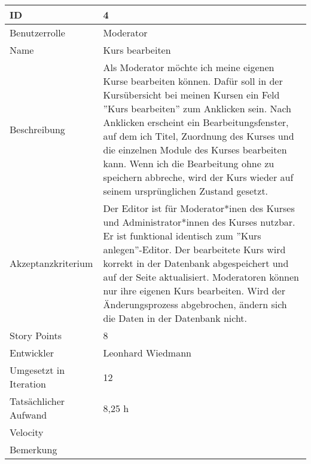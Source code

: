 \begin{tabularx}{\textwidth}{|p{}|X|}
	\hline
	ID & 4\\
	\hline
	Benutzerrolle & Moderator\\
	\hline
	Name & Kurs bearbeiten\\
	\hline
	Beschreibung & Als Moderator möchte ich meine eigenen Kurse bearbeiten können. Dafür soll in der Kursübersicht bei meinen Kursen ein Feld ''Kurs bearbeiten'' zum Anklicken sein. Nach Anklicken erscheint ein Bearbeitungsfenster, auf dem ich Titel, Zuordnung des Kurses und die einzelnen Module des Kurses bearbeiten kann. Wenn ich die Bearbeitung ohne zu speichern abbreche, wird der Kurs wieder auf seinem ursprünglichen Zustand gesetzt.\\
	\hline
	Akzeptanzkriterium & Der Editor ist für Moderator*inen des Kurses und Administrator*innen des Kurses nutzbar. Er ist funktional identisch zum ''Kurs anlegen''-Editor. Der bearbeitete Kurs wird korrekt in der Datenbank abgespeichert und auf der Seite aktualisiert. Moderatoren können nur ihre eigenen Kurs bearbeiten. Wird der Änderungsprozess abgebrochen, ändern sich die Daten in der Datenbank nicht.\\
	\hline
	Story Points & 8 \\
	\hline
	Entwickler & Leonhard Wiedmann \\
	\hline
	Umgesetzt in Iteration & 12\\
	\hline
	Tatsächlicher Aufwand & 8,25 h \\
	\hline
	Velocity & \\
	\hline
	Bemerkung & \\
	\hline
\end{tabularx}
\vspace{20pt}
